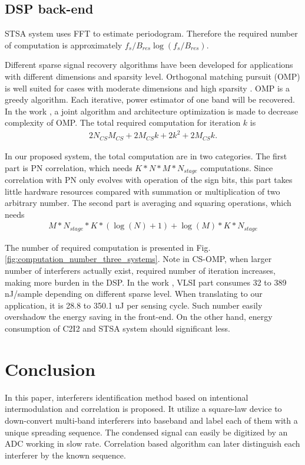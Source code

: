 \documentclass{IEEEtran}
\begin{document}
\subsection{DSP back-end}
STSA system uses FFT to estimate periodogram. Therefore the required number of computation is approximately $f_s/B_{res}\log (f_s/B_{res})$.

Different sparse signal recovery algorithms have been developed for applications with different dimensions and sparsity level. Orthogonal matching pursuit (OMP) is well suited for cases with moderate dimensions and high sparsity \cite{6331565}. OMP is a greedy algorithm. Each iterative, power estimator of one band will be recovered. In the work \cite{Ren2015},  a joint algorithm and architecture optimization is made to decrease complexity of OMP. The total required computation for iteration $k$ is 
\begin{align}
2N_{CS}M_{CS}+2M_{CS}k+2k^2+2M_{CS}k.
\end{align}

In our proposed system, the total computation are in two categories. The first part is PN correlation, which needs $K*N*M*N_{stage}$ computations. Since correlation with PN only evolves with operation of the sign bits, this part takes little hardware resources compared with summation or multiplication of two arbitrary number. The second part is averaging and squaring operations, which needs 
\begin{align}
M*N_{stage}*K*(\log(N)+1)+\log(M)*K*N_{stage}
\end{align}

The number of required computation is presented in Fig.\ref{fig:computation_number_three_systems}. Note in CS-OMP, when larger number of interferers actually exist, required number of iteration increases, making more burden in the DSP. In the work \cite{Ren2015}, VLSI part consumes 32 to 389 nJ/sample depending on different sparse level. When translating to our application, it is 28.8 to 350.1 uJ per sensing cycle. Such number easily overshadow the energy saving in the front-end. On the other hand, energy consumption of C2I2 and STSA system should significant less.

%
%
\section{Conclusion}
\label{sec:Conclusion}
In this paper, interferers identification method based on intentional intermodulation and correlation is proposed. It utilize a square-law device to down-convert multi-band interferers into baseband and label each of them with a unique spreading sequence. The condensed signal can easily be digitized by an ADC working in slow rate. Correlation based algorithm can later distinguish each interferer by the known sequence. 
\end{document}
